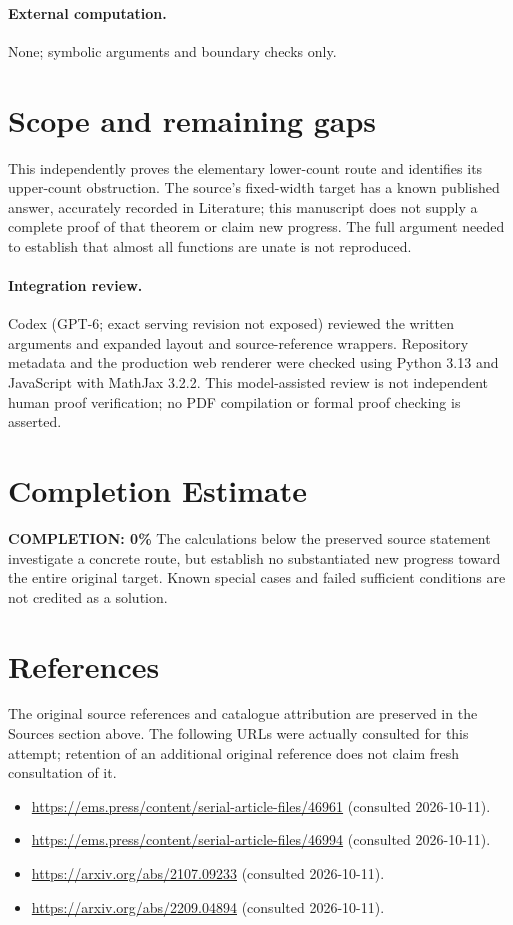 \documentclass[11pt]{article}
\begin{document}
\paragraph{External computation.} None; symbolic arguments and boundary checks only.
\section{Scope and remaining gaps}

This independently proves the elementary lower-count route and identifies its
upper-count obstruction. The source's fixed-width target has a known published
answer, accurately recorded in Literature; this manuscript does not supply a
complete proof of that theorem or claim new progress. The full argument needed
to establish that almost all functions are unate is not reproduced.

\paragraph{Integration review.} Codex (GPT-6; exact serving revision not exposed) reviewed the written arguments and expanded layout and source-reference wrappers. Repository metadata and the production web renderer were checked using Python 3.13 and JavaScript with MathJax 3.2.2. This model-assisted review is not independent human proof verification; no PDF compilation or formal proof checking is asserted.

\section{Completion Estimate}
\noindent\textbf{COMPLETION: 0\%}
The calculations below the preserved source statement investigate a concrete route,
but establish no substantiated new progress toward the entire original target.
Known special cases and failed sufficient conditions are not credited as a solution.
\section{References}
The original source references and catalogue attribution are preserved in the
Sources section above. The following URLs were actually consulted for this attempt;
retention of an additional original reference does not claim fresh consultation of it.
\begin{itemize}
\item \url{https://ems.press/content/serial-article-files/46961} (consulted 2026-10-11). 
\item \url{https://ems.press/content/serial-article-files/46994} (consulted 2026-10-11). 
\item \url{https://arxiv.org/abs/2107.09233} (consulted 2026-10-11). 
\item \url{https://arxiv.org/abs/2209.04894} (consulted 2026-10-11). 
\end{itemize}
\end{document}
